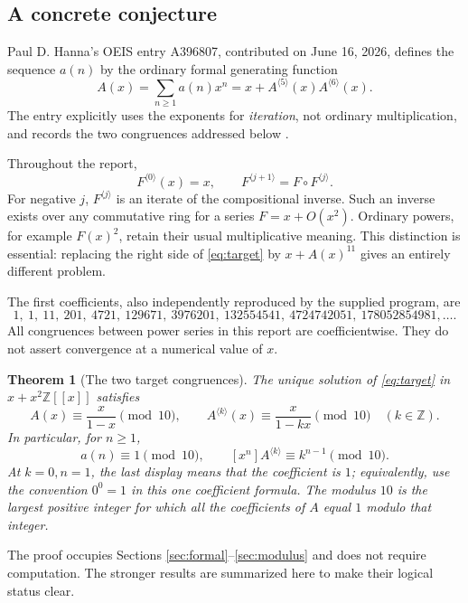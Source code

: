 \documentclass[11pt,letterpaper]{article}
\newtheorem{theorem}{Theorem}[section]
\theoremstyle{definition}
\theoremstyle{remark}
\newcommand{\Z}{\mathbb Z}
\newcommand{\iter}[2]{#1^{\langle #2\rangle}}
\newcommand{\coeff}[1]{[x^{#1}]}
\begin{document}
\subsection{A concrete conjecture}
Paul D. Hanna's OEIS entry A396807, contributed on June 16, 2026,
defines the sequence $a(n)$ by the ordinary formal generating function
\begin{equation}\label{eq:target}
 A(x)=\sum_{n\geq1}a(n)x^n
      =x+\iter{A}{5}(x)\iter{A}{6}(x).
\end{equation}
The entry explicitly uses the exponents for \emph{iteration}, not
ordinary multiplication, and records the two congruences addressed
below \cite{oeis807,oeis807internal}.

Throughout the report,
\[
 \iter{F}{0}(x)=x,\qquad
 \iter{F}{j+1}=F\circ\iter{F}{j}.
\]
For negative $j$, $\iter{F}{j}$ is an iterate of the compositional
inverse.  Such an inverse exists over any commutative ring for a series
$F=x+O(x^2)$.  Ordinary powers, for example $F(x)^2$, retain their usual
multiplicative meaning.  This distinction is essential: replacing the
right side of \eqref{eq:target} by $x+A(x)^{11}$ gives an entirely
different problem.

The first coefficients, also independently reproduced by the supplied
program, are
\[
 1,\ 1,\ 11,\ 201,\ 4721,\ 129671,\ 3976201,\ 132554541,
 \ 4724742051,\ 178052854981,\ldots.
\]
All congruences between power series in this report are coefficientwise.
They do not assert convergence at a numerical value of $x$.

\begin{theorem}[The two target congruences]\label{thm:target}
The unique solution of \eqref{eq:target} in $x+x^2\Z[[x]]$ satisfies
\begin{equation}\label{eq:maincong}
 A(x)\equiv\frac{x}{1-x}\pmod {10},\qquad
 \iter{A}{k}(x)\equiv\frac{x}{1-kx}\pmod {10}
 \quad(k\in\Z).
\end{equation}
In particular, for $n\geq1$,
\[
 a(n)\equiv1\pmod {10},\qquad
 \coeff{n}\iter{A}{k}\equiv k^{n-1}\pmod {10}.
\]
At $k=0,n=1$, the last display means that the coefficient is $1$;
equivalently, use the convention $0^0=1$ in this one coefficient formula.
The modulus $10$ is the largest positive integer for which all the
coefficients of $A$ equal $1$ modulo that integer.
\end{theorem}

The proof occupies Sections \ref{sec:formal}--\ref{sec:modulus} and does
not require computation.  The stronger results are summarized here to
make their logical status clear.
\end{document}
